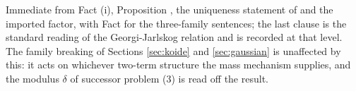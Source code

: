 Immediate from Fact (i), Proposition , the uniqueness statement of \cite[Prop.~9.32]{ButlerT12} and the imported factor, with Fact  for the three-family sentences; the last clause is the standard reading of the Georgi-Jarlskog relation and is recorded at that level. The family breaking of Sections \ref{sec:koide} and \ref{sec:gaussian} is unaffected by this: it acts on whichever two-term structure the mass mechanism supplies, and the modulus $\delta$ of successor problem (3) is read off the result.
